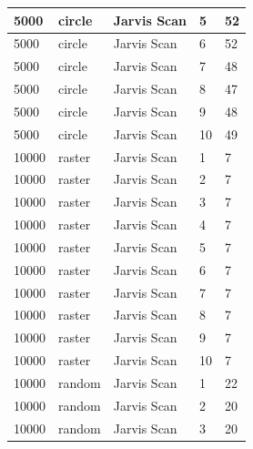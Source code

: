 \documentclass[12pt]{article}
\begin{document}
\begin{longtable}{|l|l|l|l|l|}
5000         & circle            & Jarvis Scan & 5          & 52                            \\ \hline
5000         & circle            & Jarvis Scan & 6          & 52                            \\ \hline
5000         & circle            & Jarvis Scan & 7          & 48                            \\ \hline
5000         & circle            & Jarvis Scan & 8          & 47                            \\ \hline
5000         & circle            & Jarvis Scan & 9          & 48                            \\ \hline
5000         & circle            & Jarvis Scan & 10         & 49                            \\ \hline
10000        & raster            & Jarvis Scan & 1          & 7                             \\ \hline
10000        & raster            & Jarvis Scan & 2          & 7                             \\ \hline
10000        & raster            & Jarvis Scan & 3          & 7                             \\ \hline
10000        & raster            & Jarvis Scan & 4          & 7                             \\ \hline
10000        & raster            & Jarvis Scan & 5          & 7                             \\ \hline
10000        & raster            & Jarvis Scan & 6          & 7                             \\ \hline
10000        & raster            & Jarvis Scan & 7          & 7                             \\ \hline
10000        & raster            & Jarvis Scan & 8          & 7                             \\ \hline
10000        & raster            & Jarvis Scan & 9          & 7                             \\ \hline
10000        & raster            & Jarvis Scan & 10         & 7                             \\ \hline
10000        & random            & Jarvis Scan & 1          & 22                            \\ \hline
10000        & random            & Jarvis Scan & 2          & 20                            \\ \hline
10000        & random            & Jarvis Scan & 3          & 20                            \\ \hline

\end{longtable}
\end{document}
